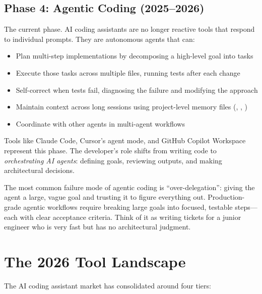 \subsection{Phase 4: Agentic Coding (2025--2026)}

The current phase. AI coding assistants are no longer reactive tools that respond to individual prompts. They are autonomous agents that can:

\begin{itemize}[leftmargin=*]
    \item Plan multi-step implementations by decomposing a high-level goal into tasks
    \item Execute those tasks across multiple files, running tests after each change
    \item Self-correct when tests fail, diagnosing the failure and modifying the approach
    \item Maintain context across long sessions using project-level memory files (, , )
    \item Coordinate with other agents in multi-agent workflows
\end{itemize}

Tools like Claude Code, Cursor's agent mode, and GitHub Copilot Workspace represent this phase. The developer's role shifts from writing code to \emph{orchestrating AI agents}: defining goals, reviewing outputs, and making architectural decisions.

\begin{cautionbox}
The most common failure mode of agentic coding is ``over-delegation'': giving the agent a large, vague goal and trusting it to figure everything out. Production-grade agentic workflows require breaking large goals into focused, testable steps---each with clear acceptance criteria. Think of it as writing tickets for a junior engineer who is very fast but has no architectural judgment.
\end{cautionbox}


\section{The 2026 Tool Landscape}

The AI coding assistant market has consolidated around four tiers:

